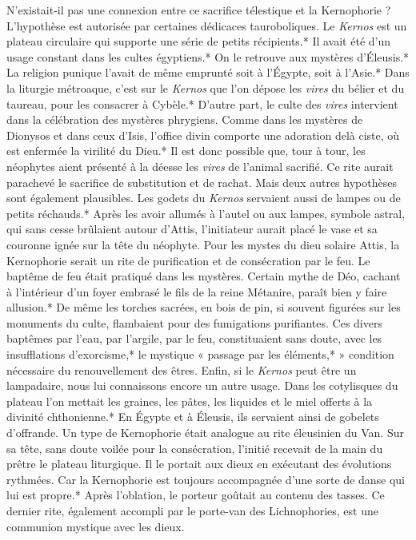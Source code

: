 \documentclass[a4paper, 11pt, oneside, polutonikogreek, french]{article}
\begin{document}
N'existait-il pas une connexion entre ce sacrifice télestique et la Kernophorie ? L'hypothèse est autorisée par certaines dédicaces tauroboliques. Le \emph{Kernos} est un plateau circulaire qui supporte une série de petits récipients.* Il avait été d'un usage constant dans les cultes égyptiens.* On le retrouve aux mystères d'Éleusis.* La religion punique l'avait de même emprunté soit à l'Égypte, soit à l'Asie.* Dans la liturgie métroaque, c'est sur le \emph{Kernos} que l'on dépose les \emph{vires} du bélier et du taureau, pour les consacrer à Cybèle.* D'autre part, le culte des \emph{vires} intervient dans la célébration des mystères phrygiens. Comme dans les mystères de Dionysos et dans ceux d'Isis, l'office divin comporte une adoration delà ciste, où est enfermée la virilité du Dieu.* Il est donc possible que, tour à tour, les néophytes aient présenté à la déesse les \emph{vires} de l'animal sacrifié. Ce rite aurait parachevé le sacrifice de substitution et de rachat. Mais deux autres hypothèses sont également plausibles. Les godets du \emph{Kernos} servaient aussi de lampes ou de petits réchauds.* Après les avoir allumés à l'autel ou aux lampes, symbole astral, qui sans cesse brûlaient autour d'Attis, l'initiateur aurait placé le vase et sa couronne ignée sur la tête du néophyte. Pour les mystes du dieu solaire Attis, la Kernophorie serait un rite de purification et de consécration par le feu. Le baptême de feu était pratiqué dans les mystères. Certain mythe de Déo, cachant à l'intérieur d'un foyer embrasé le fils de la reine Métanire, paraît bien y faire allusion.* De même les torches sacrées, en bois de pin, si souvent figurées sur les monuments du culte, flambaient pour des fumigations purifiantes. Ces divers baptêmes par l'eau, par l'argile, par le feu, constituaient sans doute, avec les insufflations d'exorcisme,* le mystique « passage par les éléments,* » condition nécessaire du renouvellement des êtres. Enfin, si le \emph{Kernos} peut être un lampadaire, nous lui connaissons encore un autre usage. Dans les cotylisques du plateau l'on mettait les graines, les pâtes, les liquides et le miel offerts à la divinité chthonienne.* En Égypte et à Éleusis, ils servaient ainsi de gobelets d'offrande. Un type de Kernophorie était analogue au rite éleusinien du Van. Sur sa tête, sans doute voilée pour la consécration, l'initié recevait de la main du prêtre le plateau liturgique. Il le portait aux dieux en exécutant des évolutions rythmées. Car la Kernophorie est toujours accompagnée d'une sorte de danse qui lui est propre.* Après l'oblation, le porteur goûtait au contenu des tasses. Ce dernier rite, également accompli par le porte-van des Lichnophories, est une communion mystique avec les dieux.
\end{document}
